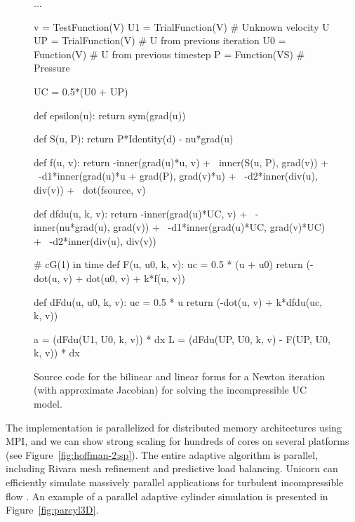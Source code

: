\begin{figure}
\bwfig
\begin{uflcode}
...

v = TestFunction(V)
U1 = TrialFunction(V) # Unknown velocity U
UP = TrialFunction(V) # U from previous iteration
U0 = Function(V)      # U from previous timestep
P = Function(VS)      # Pressure

UC = 0.5*(U0 + UP)

def epsilon(u):
    return sym(grad(u))

def S(u, P):
    return P*Identity(d) - nu*grad(u)

def f(u, v):
    return -inner(grad(u)*u, v) + \
        inner(S(u, P), grad(v)) + \
        -d1*inner(grad(u)*u + grad(P), grad(v)*u) + \
        -d2*inner(div(u), div(v)) + \
        dot(fsource, v)

def dfdu(u, k, v):
    return -inner(grad(u)*UC, v) + \
        -inner(nu*grad(u), grad(v)) + \
        -d1*inner(grad(u)*UC, grad(v)*UC) + \
        -d2*inner(div(u), div(v))

# cG(1) in time
def F(u, u0, k, v):
    uc = 0.5 * (u + u0)
    return (-dot(u, v) + dot(u0, v) + k*f(u, v))

def dFdu(u, u0, k, v):
    uc = 0.5 * u
    return (-dot(u, v) + k*dfdu(uc, k, v))

a = (dFdu(U1, U0, k, v)) * dx
L = (dFdu(UP, U0, k, v) - F(UP, U0, k, v)) * dx
\end{uflcode}
\caption{Source code for the bilinear and linear forms for a Newton
  iteration (with approximate Jacobian) for solving the incompressible
  UC model.}
\label{code:FFC_UC}
\end{figure}

The  implementation is parallelized for distributed
memory architectures using MPI, and we can show strong scaling for
hundreds of cores on several platforms (see
Figure~\ref{fig:hoffman-2:sp}). The entire adaptive algorithm is
parallel, including Rivara mesh refinement and \apriori{} predictive
load balancing. Unicorn can efficiently simulate massively parallel
applications for turbulent incompressible flow
\citep{JanssonHoffmanJansson2010, Jansson2011}. An example of a
parallel adaptive cylinder simulation is presented in
Figure~\ref{fig:parcyl3D}.

